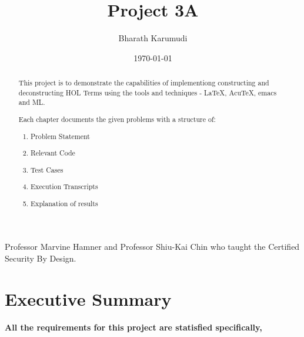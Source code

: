 \documentclass{report}
\title{Project 3A}
\author{Bharath Karumudi}
\date{\today}
\begin{document}
 \lstset{language=ML}
 \maketitle{}

 \begin{abstract}
   This project is to demonstrate the capabilities of implementiong
   constructing and deconstructing HOL Terms using the tools and
   techniques - \LaTeX{}, AcuTeX, emacs and ML. 

   Each chapter documents the given problems with a structure of:
   \begin{enumerate}
   \item Problem Statement
   \item Relevant Code
   \item Test Cases
   \item Execution Transcripts
   \item Explanation of results
   \end{enumerate}

 \end{abstract}


 \begin{acknowledgments}
  Professor Marvine Hamner and Professor Shiu-Kai Chin who taught the
  Certified Security By Design.
 \end{acknowledgments}

 \tableofcontents{}

 \chapter{Executive Summary}
 \label{cha:executive-summary}

\textbf{All the requirements for this project are statisfied specifically,}
\end{document}
